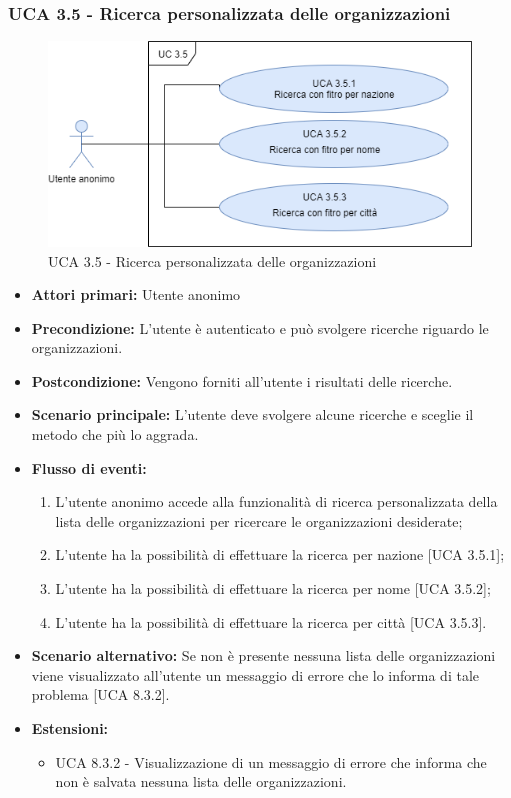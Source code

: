 \subsubsection{UCA 3.5 - Ricerca personalizzata delle organizzazioni}%
\begin{figure}[h]
	\centering
	
	\includegraphics[scale=0.5, center]{sezioni/UseCase/Immagini/UCA3.5.png}
	\caption{UCA 3.5 - Ricerca personalizzata delle organizzazioni}
\end{figure}
\begin{itemize}
	\item \textbf{Attori primari:} Utente anonimo
	\item \textbf{Precondizione:} L'utente è autenticato e può svolgere ricerche riguardo le organizzazioni.
	\item \textbf{Postcondizione:} Vengono forniti all'utente i risultati delle ricerche.
	\item \textbf{Scenario principale:} L'utente deve svolgere alcune ricerche e sceglie il metodo che più lo aggrada.
	\item \textbf{Flusso di eventi:} 
	\begin{enumerate}
		\item L'utente anonimo accede alla funzionalità di ricerca personalizzata della lista delle organizzazioni per ricercare le organizzazioni desiderate;
		\item L'utente ha la possibilità di effettuare la ricerca per nazione [UCA 3.5.1];
		\item L'utente ha la possibilità di effettuare la ricerca per nome [UCA 3.5.2];
		\item L'utente ha la possibilità di effettuare la ricerca per città [UCA 3.5.3].
	\end{enumerate}
	\item \textbf{Scenario alternativo:} Se non è presente nessuna lista delle organizzazioni viene visualizzato all'utente un messaggio di errore che lo informa di tale problema [UCA 8.3.2].
	\item \textbf{Estensioni:}
	\begin{itemize}
		\item UCA 8.3.2 - Visualizzazione di un messaggio di errore che informa che non è salvata nessuna lista delle organizzazioni.
	\end{itemize}
\end{itemize}

